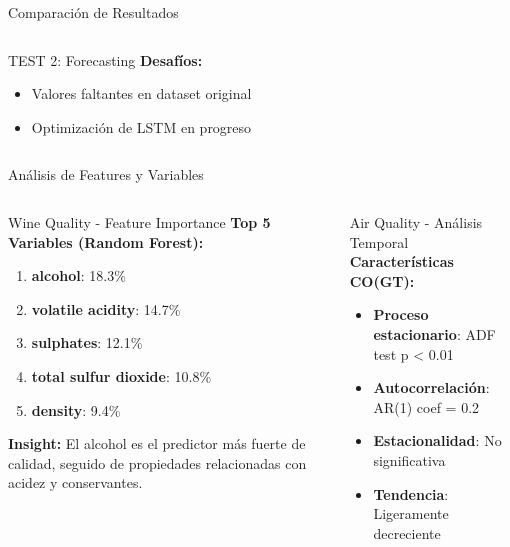 \documentclass[aspectratio=169]{beamer}
\begin{document}
\begin{frame}{Comparación de Resultados}
\begin{columns}[T]
\begin{column}{0.48\textwidth}
\begin{block}{TEST 2: Forecasting}
                \textbf{Desafíos:}
                \begin{itemize}
                    \item Valores faltantes en dataset original
                    \item Optimización de LSTM en progreso
                \end{itemize}
            \end{block}
        \end{column}
    \end{columns}
\end{frame}

\begin{frame}{Análisis de Features y Variables}
    \begin{columns}[T]
        \begin{column}{0.48\textwidth}
            \begin{block}{Wine Quality - Feature Importance}
                \textbf{Top 5 Variables (Random Forest):}
                \begin{enumerate}
                    \item \textbf{alcohol}: 18.3\%
                    \item \textbf{volatile acidity}: 14.7\%
                    \item \textbf{sulphates}: 12.1\%
                    \item \textbf{total sulfur dioxide}: 10.8\%
                    \item \textbf{density}: 9.4\%
                \end{enumerate}
                
                \vspace{0.3cm}
                \textbf{Insight:} El alcohol es el predictor más fuerte de calidad, seguido de propiedades relacionadas con acidez y conservantes.
            \end{block}
        \end{column}
        
        \begin{column}{0.48\textwidth}
            \begin{block}{Air Quality - Análisis Temporal}
                \textbf{Características CO(GT):}
                \begin{itemize}
                    \item \textbf{Proceso estacionario}: ADF test p < 0.01
                    \item \textbf{Autocorrelación}: AR(1) coef = 0.2
                    \item \textbf{Estacionalidad}: No significativa
                    \item \textbf{Tendencia}: Ligeramente decreciente
                \end{itemize}
                

\end{block}
\end{column}
\end{columns}
\end{frame}
\end{document}
